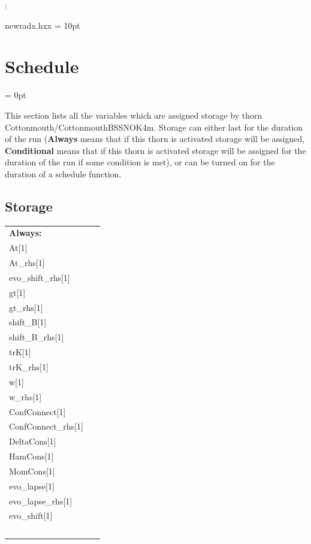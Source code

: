 \documentclass{article}
\begin{document}
\vspace{5mm}

: 

newradx.hxx
\vspace{2mm}\parskip = 10pt 

\section{Schedule} 


\parskip = 0pt


\noindent This section lists all the variables which are assigned storage by thorn Cottonmouth/CottonmouthBSSNOK4m.  Storage can either last for the duration of the run ({\bf Always} means that if this thorn is activated storage will be assigned, {\bf Conditional} means that if this thorn is activated storage will be assigned for the duration of the run if some condition is met), or can be turned on for the duration of a schedule function.


\subsection*{Storage}

\hspace{5mm}

 \begin{tabular*}{160mm}{ll} 

{\bf Always:}&  ~ \\ 
 At[1] & ~\\ 
 At\_rhs[1] & ~\\ 
 evo\_shift\_rhs[1] & ~\\ 
 gt[1] & ~\\ 
 gt\_rhs[1] & ~\\ 
 shift\_B[1] & ~\\ 
 shift\_B\_rhs[1] & ~\\ 
 trK[1] & ~\\ 
 trK\_rhs[1] & ~\\ 
 w[1] & ~\\ 
 w\_rhs[1] & ~\\ 
 ConfConnect[1] & ~\\ 
 ConfConnect\_rhs[1] & ~\\ 
 DeltaCons[1] & ~\\ 
 HamCons[1] & ~\\ 
 MomCons[1] & ~\\ 
 evo\_lapse[1] & ~\\ 
 evo\_lapse\_rhs[1] & ~\\ 
 evo\_shift[1] & ~\\ 
~ & ~\\ 
\end{tabular*} 
\end{document}
